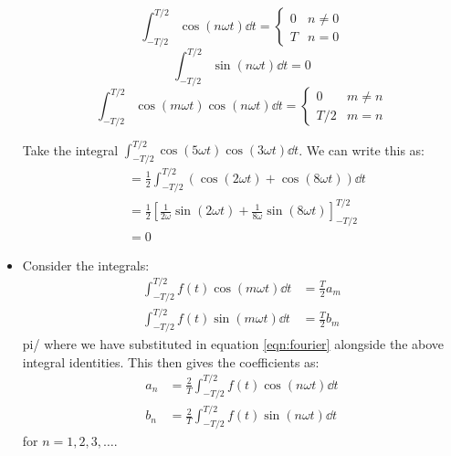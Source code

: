 \begin{itemize}
    \begin{equation}
        \int_{-T/2}^{T/2} \cos(n\omega t)\dd{t} = \begin{cases}
            0 & n\neq 0 \\ 
            T & n=0
        \end{cases}
    \end{equation}
    \begin{equation}
        \int_{-T/2}^{T/2}\sin(n\omega t)\dd{t} = 0
    \end{equation}
    \begin{equation}
        \int_{-T/2}^{T/2}\cos(m\omega t)\cos(n\omega t)\dd{t} = \begin{cases}
            0 & m\neq n \\ 
            T/2 & m=n
        \end{cases}
    \end{equation}
    \begin{example}
        Take the integral $\int_{-T/2}^{T/2} \cos(5\omega t)\cos(3\omega t)\dd{t}$. We can write this as:
        \begin{align}
            &= \frac{1}{2}\int_{-T/2}^{T/2}(\cos(2\omega t) + \cos(8\omega t))\dd{t} \\ 
            &= \frac{1}{2}\left[\frac{1}{2\omega} \sin(2\omega t) + \frac{1}{8\omega}\sin(8\omega t)\right]^{T/2}_{-T/2} \\ 
            &= 0
        \end{align}
    \end{example}
    \item Consider the integrals:
    \begin{align}
        \int_{-T/2}^{T/2} f(t)\cos(m\omega t) \dd{t} &= \frac{T}{2}a_m \\ 
        \int_{-T/2}^{T/2} f(t)\sin(m\omega t) \dd{t} &= \frac{T}{2}b_m 
    \end{align}pi/
    where we have substituted in equation \ref{eqn:fourier} alongside the above integral identities. This then gives the coefficients as:
    \begin{align}
        a_n &= \frac{2}{T}\int_{-T/2}^{T/2} f(t)\cos(n\omega t)\dd{t} \\ 
        b_n &= \frac{2}{T}\int_{-T/2}^{T/2} f(t)\sin(n\omega t)\dd{t}
    \end{align}
    for $n=1,2,3,\dots$.
\end{itemize}